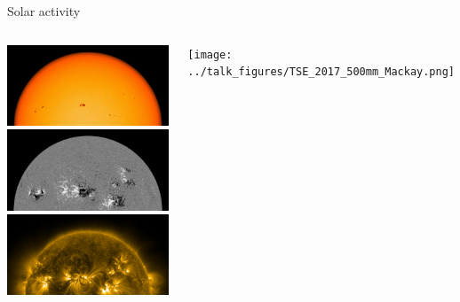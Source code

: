 \begin{frame}[plain,c]{Solar activity}{}
	\begin{columns}[c]
		
		\includegraphics[width=\textwidth]{../talk_figures/20130516_170000_4096_HMIIC_half.jpg}\\
		\pause
		\includegraphics[width=\textwidth]{../talk_figures/20130516_170000_4096_HMIB_half.jpg}\\
		\pause
		\includegraphics[width=\textwidth]{../talk_figures/20130516_170048_4096_0171_half.jpg}
		\pause
		
		
		\texttt{[image: ../talk\_figures/TSE\_2017\_500mm\_Mackay.png]}

	\end{columns}
\end{frame}

